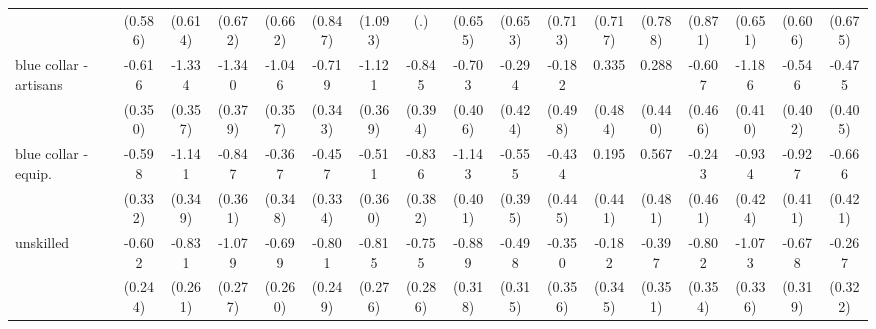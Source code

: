 {\begin{tabular}{l*{16}{c}}
                    &     (0.586)         &     (0.614)         &     (0.672)         &     (0.662)         &     (0.847)         &     (1.093)         &         (.)         &     (0.655)         &     (0.653)         &     (0.713)         &     (0.717)         &     (0.788)         &     (0.871)         &     (0.651)         &     (0.606)         &     (0.675)         \\
[1em]
blue collar - artisans&      -0.616         &      -1.334\sym{***}&      -1.340\sym{***}&      -1.046\sym{**} &      -0.719\sym{*}  &      -1.121\sym{**} &      -0.845\sym{*}  &      -0.703         &      -0.294         &      -0.182         &       0.335         &       0.288         &      -0.607         &      -1.186\sym{**} &      -0.546         &      -0.475         \\
                    &     (0.350)         &     (0.357)         &     (0.379)         &     (0.357)         &     (0.343)         &     (0.369)         &     (0.394)         &     (0.406)         &     (0.424)         &     (0.498)         &     (0.484)         &     (0.440)         &     (0.466)         &     (0.410)         &     (0.402)         &     (0.405)         \\
[1em]
blue collar - equip.&      -0.598         &      -1.141\sym{**} &      -0.847\sym{*}  &      -0.367         &      -0.457         &      -0.511         &      -0.836\sym{*}  &      -1.143\sym{**} &      -0.555         &      -0.434         &       0.195         &       0.567         &      -0.243         &      -0.934\sym{*}  &      -0.927\sym{*}  &      -0.666         \\
                    &     (0.332)         &     (0.349)         &     (0.361)         &     (0.348)         &     (0.334)         &     (0.360)         &     (0.382)         &     (0.401)         &     (0.395)         &     (0.445)         &     (0.441)         &     (0.481)         &     (0.461)         &     (0.424)         &     (0.411)         &     (0.421)         \\
[1em]
unskilled           &      -0.602\sym{*}  &      -0.831\sym{**} &      -1.079\sym{***}&      -0.699\sym{**} &      -0.801\sym{**} &      -0.815\sym{**} &      -0.755\sym{**} &      -0.889\sym{**} &      -0.498         &      -0.350         &      -0.182         &      -0.397         &      -0.802\sym{*}  &      -1.073\sym{**} &      -0.678\sym{*}  &      -0.267         \\
                    &     (0.244)         &     (0.261)         &     (0.277)         &     (0.260)         &     (0.249)         &     (0.276)         &     (0.286)         &     (0.318)         &     (0.315)         &     (0.356)         &     (0.345)         &     (0.351)         &     (0.354)         &     (0.336)         &     (0.319)         &     (0.322)         \\

\end{tabular}}
